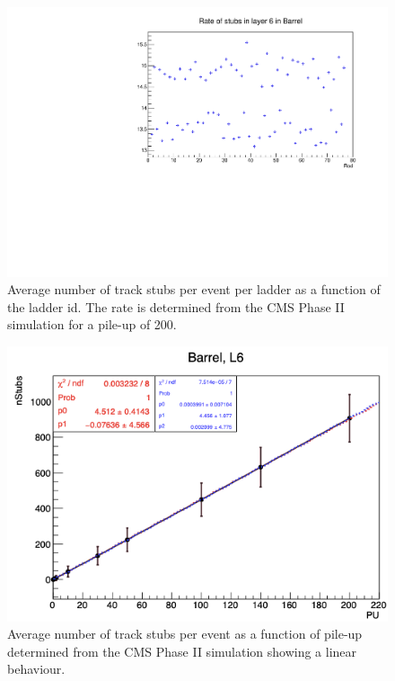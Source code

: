 \begin{figure}[hbtp]
\centering
\includegraphics[width=.6\linewidth]{tex/Part2/fig/OT/OT-Rates.pdf}
\caption{
  Average number of track stubs per event per ladder as a function of the ladder id.
  The rate is determined from the CMS Phase II simulation for a pile-up of 200.
}
\label{fig:OT_rates}
\end{figure}


\begin{figure}[hbtp]
\centering
\includegraphics[width=.6\linewidth]{tex/Part2/fig/OT/OT-linearity.png}
\caption{
 Average number of track stubs per event as a function of pile-up determined from the CMS Phase II simulation showing a linear behaviour.
} 
\label{fig:OT_linearity}
\end{figure}
